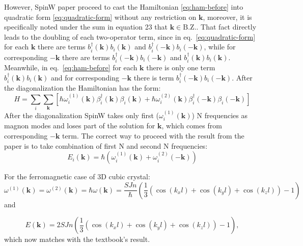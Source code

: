 \documentclass[a4paper,12pt]{article}
\begin{document}
    However, SpinW paper proceed to cast the Hamiltonian \eqref{eq:ham-before} into quadratic form \eqref{eq:quadratic-form} without any restriction on $\boldsymbol{k}$,
    moreover, it is specifically noted under the sum in equation 23 that $\boldsymbol{k} \in \text{B.Z.}$. 
    That fact directly leads to the doubling of each two-operator term, since in eq.~\eqref{eq:quadratic-form} for each $\boldsymbol{k}$ 
    there are terms $b^{\dag}_i(\boldsymbol{k})b_i(\boldsymbol{k})$ and $b^{\dag}_i(-\boldsymbol{k})b_i(-\boldsymbol{k})$, 
    while for corresponding $-\boldsymbol{k}$ there are terms $b^{\dag}_i(-\boldsymbol{k})b_i(-\boldsymbol{k})$ and $b^{\dag}_i(\boldsymbol{k})b_i(\boldsymbol{k})$. 
    Meanwhile, in eq.~\eqref{eq:ham-before} for each $\boldsymbol{k}$ 
    there is only one term $b^{\dag}_i(\boldsymbol{k})b_i(\boldsymbol{k})$ and for corresponding $-\boldsymbol{k}$ there is term $b^{\dag}_i(-\boldsymbol{k})b_i(-\boldsymbol{k})$.
    After the diagonalization the Hamiltonian has the form:
    \begin{equation}
        H = \sum_{i}\sum_{\boldsymbol{k}}\left[
            \hbar\omega^{(1)}_i(\boldsymbol{k})\beta^{\dag}_i(\boldsymbol{k})\beta_i(\boldsymbol{k}) +
            \hbar\omega^{(2)}_i(\boldsymbol{k})\beta^{\dag}_i(-\boldsymbol{k})\beta_i(-\boldsymbol{k})\right]
    \end{equation}
    After the diagonalization SpinW takes only first 
    ($\omega^{(1)}_i(\boldsymbol{k})$) N frequencies as magnon modes and
    loses part of the solution for $\boldsymbol{k}$, which comes from corresponding $-\boldsymbol{k}$ term. 
    The correct way to proceed with the result from the paper is to take combination of first N and second N frequencies:
    \begin{equation}
        E_i(\boldsymbol{k}) = \hbar(\omega_i^{(1)}(\boldsymbol{k}) + \omega_i^{(2)}(-\boldsymbol{k}))
    \end{equation}

    For the ferromagnetic case of 3D cubic crystal:
    \begin{equation}
        \omega^{(1)}(\boldsymbol{k}) = \omega^{(2)}(\boldsymbol{k}) = \hbar\omega(\boldsymbol{k}) = \dfrac{SJn}{\hbar}\left(\dfrac{1}{3}\left(\cos(k_xl) + \cos(k_yl) + \cos(k_zl)\right) - 1\right)
    \end{equation}
    and

    \begin{equation}
        E(\boldsymbol{k}) = 2SJn\left(\dfrac{1}{3}\left(\cos(k_xl) + \cos(k_yl) + \cos(k_zl)\right) - 1\right),
    \end{equation}
    which now matches with the textbook's result.
\end{document}
